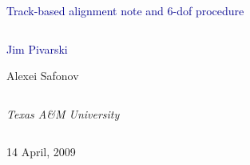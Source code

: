 \documentclass[compress]{beamer}
\begin{document}
\begin{frame}
\vfill
\begin{center}
\textcolor{darkblue}{\Large Track-based alignment note and 6-dof procedure}

\vfill
\begin{columns}
\begin{center}
\large
\textcolor{darkblue}{Jim Pivarski}

\vspace{0.2 cm}
Alexei Safonov
\end{center}
\end{columns}

\begin{columns}
\begin{center}
\scriptsize
{\it Texas A\&M University}
\end{center}
\end{columns}

\vfill
14 April, 2009

\end{center}
\end{frame}


\small
\end{document}
